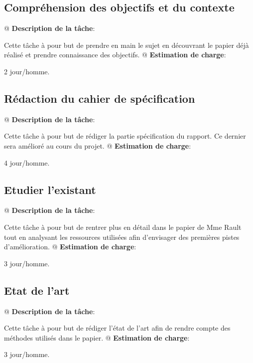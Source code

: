 \documentclass[final]{polytech/polytech}
\begin{document}
		\subsection{Compréhension des objectifs et du contexte}
			\begin{easylist}
				@ \textbf{Description de la tâche}:
				
				Cette tâche à pour but de prendre en main le sujet en découvrant le papier déjà réalisé et prendre connaissance des objectifs.
				@ \textbf{Estimation de charge}:
				
				2 jour/homme.
			\end{easylist}
			
		\subsection{Rédaction du cahier de spécification}
			\begin{easylist}
				@ \textbf{Description de la tâche}:
				
				Cette tâche à pour but de rédiger la partie spécification du rapport. Ce dernier sera amélioré au cours du projet.
				@ \textbf{Estimation de charge}:
				
				4 jour/homme.
			\end{easylist}
			
		\subsection{Etudier l’existant}
			\begin{easylist}
				@ \textbf{Description de la tâche}:
				
				Cette tâche à pour but de rentrer plus en détail dans le papier de Mme Rault tout en analysant les ressources utilisées afin d'envisager des premières pistes d'amélioration.
				@ \textbf{Estimation de charge}:
				
				3 jour/homme.
			\end{easylist}
			
		\subsection{Etat de l'art}
			\begin{easylist}
				@ \textbf{Description de la tâche}:
				
				Cette tâche à pour but de rédiger l'état de l'art afin de rendre compte des méthodes utilisés dans le papier.
				@ \textbf{Estimation de charge}:
				
				3 jour/homme.
			\end{easylist}
			
\end{document}
